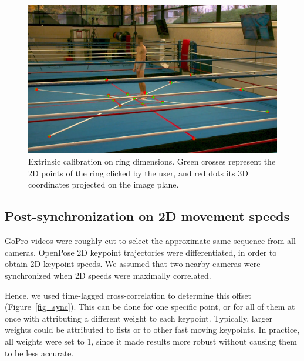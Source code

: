 \begin{figure}[!ht]
	\centering
	\def\svgwidth{1\columnwidth}
	\fontsize{10pt}{10pt}\selectfont
	\includegraphics[width=\linewidth]{"../Chap6/Figures/Fig_Calib.png"}
	\caption{Extrinsic calibration on ring dimensions. Green crosses represent the 2D points of the ring clicked by the user, and red dots its 3D coordinates projected on the image plane.}
	\label{fig_calib}
\end{figure}


\subsection{Post-synchronization on 2D movement speeds}

GoPro videos were roughly cut to select the approximate same sequence from all cameras. OpenPose 2D keypoint trajectories were differentiated, in order to obtain 2D keypoint speeds. We assumed that two nearby cameras were synchronized when 2D speeds were maximally correlated. 

Hence, we used time-lagged cross-correlation to determine this offset (Figure~\ref{fig_sync}). This can be done for one specific point, or for all of them at once with attributing a different weight to each keypoint. Typically, larger weights could be attributed to fists or to other fast moving keypoints. In practice, all weights were set to 1, since it made results more robust without causing them to be less accurate.

